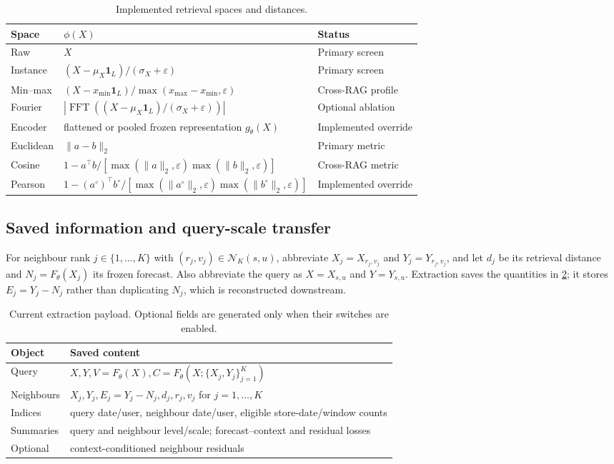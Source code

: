 \documentclass[10pt]{article}
\begin{document}
\begin{table}[H]
\centering
\small
\caption{Implemented retrieval spaces and distances.}
\label{tab:retrieval-spaces}
\begin{tabularx}{\linewidth}{@{}llX@{}}
\toprule
Space & $\phi(X)$ & Status \\
\midrule
Raw & $X$ & Primary screen \\
Instance & $(X-\mu_X\mathbf1_L)/(\sigma_X+\varepsilon)$ & Primary screen \\
Min--max & $(X-x_{\min}\mathbf1_L)/\max(x_{\max}-x_{\min},\varepsilon)$ & Cross-RAG profile \\
Fourier & $|\operatorname{FFT}((X-\mu_X\mathbf1_L)/(\sigma_X+\varepsilon))|$ & Optional ablation \\
Encoder & flattened or pooled frozen representation $g_\theta(X)$ & Implemented override \\
\midrule
Euclidean & $\|a-b\|_2$ & Primary metric \\
Cosine & $1-a^\top b/[\max(\|a\|_2,\varepsilon)\max(\|b\|_2,\varepsilon)]$ & Cross-RAG metric \\
Pearson & $1-(a^\circ)^\top b^\circ/[\max(\|a^\circ\|_2,\varepsilon)\max(\|b^\circ\|_2,\varepsilon)]$ & Implemented override \\
\bottomrule
\end{tabularx}
\end{table}

\subsection{Saved information and query-scale transfer}

For neighbour rank $j\in\{1,\ldots,K\}$ with
$(r_j,v_j)\in\mathcal N_K(s,u)$, abbreviate
$X_j=X_{r_j,v_j}$ and $Y_j=Y_{r_j,v_j}$, and let $d_j$ be its retrieval
distance and $N_j=F_\theta(X_j)$ its frozen forecast. Also abbreviate the query
as $X=X_{s,u}$ and $Y=Y_{s,u}$. Extraction saves the quantities in
\cref{tab:retrieval-payload}; it stores $E_j=Y_j-N_j$ rather than duplicating
$N_j$, which is reconstructed downstream.

\begin{table}[H]
\centering
\small
\caption{Current extraction payload. Optional fields are generated only when
their switches are enabled.}
\label{tab:retrieval-payload}
\begin{tabularx}{\linewidth}{@{}lX@{}}
\toprule
Object & Saved content \\
\midrule
Query & $X,Y,V=F_\theta(X),C=F_\theta(X;\{X_j,Y_j\}_{j=1}^K)$ \\
Neighbours & $X_j,Y_j,E_j=Y_j-N_j,d_j,r_j,v_j$ for $j=1,\ldots,K$ \\
Indices & query date/user, neighbour date/user, eligible store-date/window counts \\
Summaries & query and neighbour level/scale; forecast--context and residual losses \\
Optional & context-conditioned neighbour residuals \\
\bottomrule
\end{tabularx}
\end{table}
\end{document}
